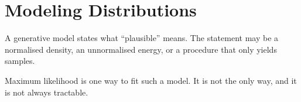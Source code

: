 \chapter{Modeling Distributions}
\label{ch:modeling-distributions}

A generative model states what ``plausible'' means. The statement may be a normalised density, an unnormalised energy, or a procedure that only yields samples.

Maximum likelihood is one way to fit such a model. It is not the only way, and it is not always tractable.
